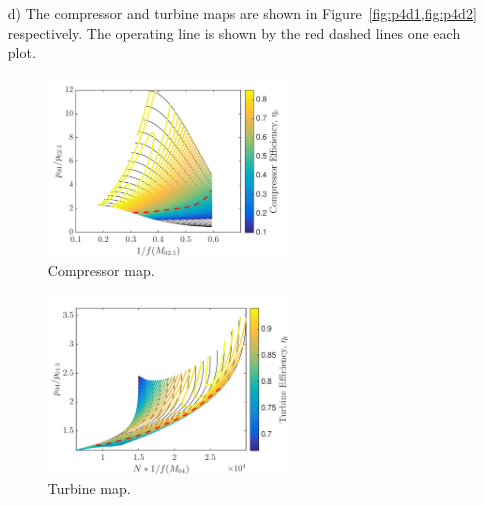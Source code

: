 \documentclass[12pt]{article}
\begin{document}
\begin{itemize}
	\item[d)]
	The compressor and turbine maps are shown in Figure~\ref{fig:p4d1,fig:p4d2} respectively. The operating line is shown by the red dashed lines one each plot.
	\begin{figure}[H]
		\centering
		\includegraphics[width=0.6\textwidth]{p4d1}
		\caption{Compressor map.}
		\label{fig:p4d1}
	\end{figure}
		
	\begin{figure}[H]
		\centering
		\includegraphics[width=0.6\textwidth]{p4d2}
		\caption{Turbine map.}
		\label{fig:p4d2}
	\end{figure}
	
\end{itemize}
\end{document}
